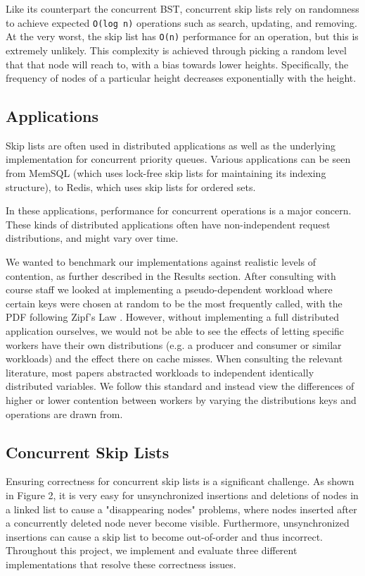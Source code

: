 \documentclass[11pt]{article}
\newcommand{\ttt}[1]{\texttt{#1}}
\begin{document}
Like its counterpart the concurrent BST, concurrent skip lists rely on randomness to achieve expected \ttt{O(log n)} operations such as search, updating, and removing. At the very worst, the skip list has \ttt{O(n)} performance for an operation, but this is extremely unlikely. This complexity is achieved through picking a random level that that node will reach to, with a bias towards lower heights. Specifically, the frequency of nodes of a particular height decreases exponentially with the height.\cite{herlihy2006provably}

\subsection{Applications}
Skip lists are often used in distributed applications as well as the underlying implementation for concurrent priority queues. Various applications can be seen from MemSQL (which uses lock-free skip lists for maintaining its indexing structure), to Redis, which uses skip lists for ordered sets.

In these applications, performance for concurrent operations is a major concern. These kinds of distributed applications often have non-independent request distributions, and might vary over time. 

We wanted to benchmark our implementations against realistic levels of contention, as further described in the Results section. After consulting with course staff we looked at implementing a pseudo-dependent workload where certain keys were chosen at random to be the most frequently called, with the PDF following Zipf's Law \cite{wikipedia_2022_Zipf}. However, without implementing a full distributed application ourselves, we would not be able to see the effects of letting specific workers have their own distributions (e.g. a producer and consumer or similar workloads) and the effect there on cache misses. When consulting the relevant literature, most papers abstracted workloads to independent identically distributed variables. We follow this standard and instead view the differences of higher or lower contention between workers by varying the distributions keys and operations are drawn from.

\subsection{Concurrent Skip Lists}
Ensuring correctness for concurrent skip lists is a significant challenge. As shown in Figure 2, it is very easy for unsynchronized insertions and deletions of nodes in a linked list to cause a "disappearing nodes" problems, where nodes inserted after a concurrently deleted node never become visible. Furthermore, unsynchronized insertions can cause a skip list to become out-of-order and thus incorrect. Throughout this project, we implement and evaluate three different implementations that resolve these correctness issues.
\end{document}

